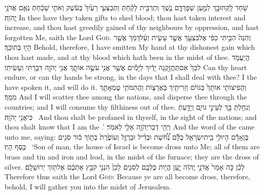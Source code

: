 {שֹׁ֥חַד לָֽקְחוּ\maqqaf בָ֖ךְ לְמַ֣עַן שְׁפׇךְ\maqqaf דָּ֑ם נֶ֧שֶׁךְ וְתַרְבִּ֣ית לָקַ֗חַתְּ וַתְּבַצְּעִ֤י רֵעַ֙יִךְ֙ בַּעֹ֔שֶׁק וְאֹתִ֣י שָׁכַ֔חַתְּ נְאֻ֖ם אֲדֹנָ֥י יֱהֹוִֽה׃}
{In thee have they taken gifts to shed blood; thou hast taken interest and increase, and thou hast greedily gained of thy neighbours by oppression, and hast forgotten Me, saith the Lord \textsc{God}.}
{וְהִנֵּה֙ הִכֵּ֣יתִי כַפִּ֔י אֶל\maqqaf בִּצְעֵ֖ךְ אֲשֶׁ֣ר עָשִׂ֑ית וְעַ֨ל\maqqaf דָּמֵ֔ךְ אֲשֶׁ֥ר הָי֖וּ בְּתוֹכֵֽךְ׃}
{Behold, therefore, I have smitten My hand at thy dishonest gain which thou hast made, and at thy blood which hath been in the midst of thee.}
{הֲיַעֲמֹ֤ד לִבֵּךְ֙ אִם\maqqaf תֶּחֱזַ֣קְנָה יָדַ֔יִךְ לַיָּמִ֕ים אֲשֶׁ֥ר אֲנִ֖י עֹשֶׂ֣ה אוֹתָ֑ךְ אֲנִ֥י יְהֹוָ֖ה דִּבַּ֥רְתִּי וְעָשִֽׂיתִי׃}
{Can thy heart endure, or can thy hands be strong, in the days that I shall deal with thee? I the \lord\space have spoken it, and will do it.}
{וַהֲפִיצוֹתִ֤י אוֹתָךְ֙ בַּגּוֹיִ֔ם וְזֵרִיתִ֖יךְ בָּאֲרָצ֑וֹת וַהֲתִמֹּתִ֥י טֻמְאָתֵ֖ךְ מִמֵּֽךְ׃}
{And I will scatter thee among the nations, and disperse thee through the countries; and I will consume thy filthiness out of thee.}
{וְנִחַ֥לְתְּ בָּ֖ךְ לְעֵינֵ֣י גוֹיִ֑ם וְיָדַ֖עַתְּ כִּי\maqqaf אֲנִ֥י יְהֹוָֽה׃ \petucha }
{And thou shalt be profaned in thyself, in the sight of the nations; and thou shalt know that I am the \lord.’}
{וַיְהִ֥י דְבַר\maqqaf יְהֹוָ֖ה אֵלַ֥י לֵאמֹֽר׃}
{And the word of the \lord\space came unto me, saying:}
{בֶּן\maqqaf אָדָ֕ם הָיוּ\maqqaf לִ֥י בֵֽית\maqqaf יִשְׂרָאֵ֖ל  כֻּלָּ֡ם נְ֠חֹ֠שֶׁת וּבְדִ֨יל וּבַרְזֶ֤ל וְעוֹפֶ֙רֶת֙ בְּת֣וֹךְ כּ֔וּר סִגִ֥ים כֶּ֖סֶף הָיֽוּ׃ \setuma }
{‘Son of man, the house of Israel is become dross unto Me; all of them are brass and tin and iron and lead, in the midst of the furnace; they are the dross of silver.}
{לָכֵ֗ן כֹּ֤ה אָמַר֙ אֲדֹנָ֣י יֱהֹוִ֔ה יַ֛עַן הֱי֥וֹת כֻּלְּכֶ֖ם לְסִגִ֑ים לָכֵן֙ הִנְנִ֣י קֹבֵ֣ץ אֶתְכֶ֔ם אֶל\maqqaf תּ֖וֹךְ יְרוּשָׁלָֽ͏ִם׃}
{Therefore thus saith the Lord \textsc{God}: Because ye are all become dross, therefore, behold, I will gather you into the midst of Jerusalem.}
\label{haft_30}
\setcounter{chap}{9}
\setcounter{verse}{7}
